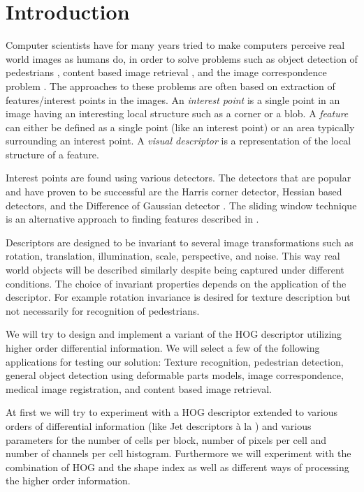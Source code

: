 \documentclass[../thesis.tex]{subfiles}
\begin{document}
\section{Introduction}

Computer scientists have for many years tried to make computers perceive real
world images as humans do, in order to solve problems such as
object detection of pedestrians \cite{felzenszwalb2008discriminatively},
content based image retrieval \cite{smeulders2000content}, and
the image correspondence problem \cite{dahl2011finding}.
%
The approaches to these problems are often based on extraction of
features/interest points in the images.
An \emph{interest point} is a single point in an image having an interesting local
structure such as a corner or a blob. A \emph{feature} can either be defined as a
single point (like an interest point) or an area typically surrounding an
interest point. A \emph{visual descriptor} is a representation of the local structure
of a feature. 

Interest points are found using various detectors. The detectors that are
popular and have proven to be successful are the Harris corner detector, Hessian
based detectors, and the Difference of Gaussian detector
\cite{aanaes2012interesting}. The sliding window technique is an alternative
approach to finding features described in \cite{dalal2005histograms}.

Descriptors are designed to be invariant to several image transformations such
as rotation, translation, illumination, scale, perspective, and noise. This way
real world objects will be described similarly despite being captured under
different conditions. The choice of invariant properties depends on the
application of the descriptor. For example rotation invariance is desired for
texture description but not necessarily for recognition of pedestrians.

We will try to design and implement a variant of the HOG descriptor utilizing
higher order differential information. We
will select a few of the following applications for testing our solution:
Texture recognition, pedestrian detection, general object detection using
deformable parts models, image correspondence, medical image registration, and
content based image retrieval.

At first we will try to experiment with a HOG descriptor extended to
various orders of differential information (like Jet descriptors à la
\cite{larsen2012jet}) and various parameters for the number of cells per
block, number of pixels per cell and number of channels per cell histogram.
Furthermore we will experiment with the combination of HOG and the shape index
\cite{koenderink1992surface} as well as different ways of processing the
higher order information.



\subbibliography
\end{document}
